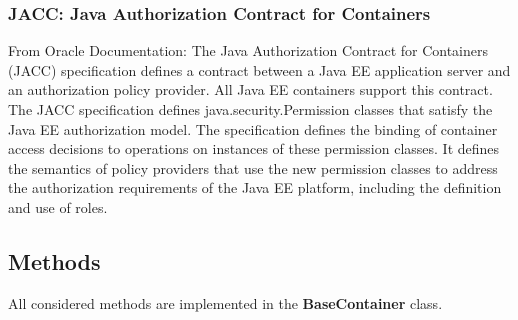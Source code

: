 \documentclass[11pt, a4paper,titlepage]{article}
\begin{document}
	\subsubsection{JACC: Java Authorization Contract for Containers}
	From Oracle Documentation:
	The Java Authorization Contract for Containers (JACC) specification defines a contract between a Java EE application server and an authorization policy provider. All Java EE containers support this contract.
	\newline \newline 
	The JACC specification defines java.security.Permission classes that satisfy the Java EE authorization model. The specification defines the binding of container access decisions to operations on instances of these permission classes. It defines the semantics of policy providers that use the new permission classes to address the authorization requirements of the Java EE platform, including the definition and use of roles.
	\newpage
	 \subsection{Methods}
	 All considered methods are implemented in the \textbf{BaseContainer} class. 
\end{document}
